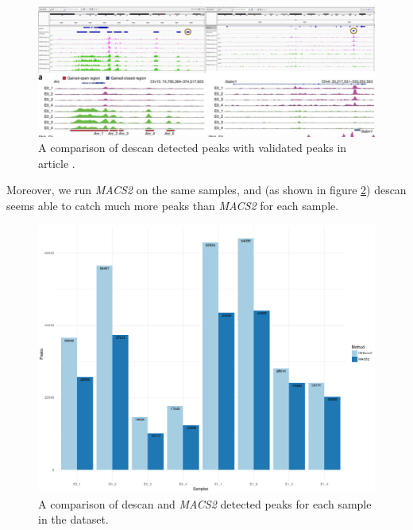 \begin{figure}[H]
\includegraphics[width=\textwidth,height=\textheight,keepaspectratio]{img/descan2/peaks.png}
\caption[\gls{descan} peaks detection]{A comparison of \gls{descan} detected peaks with validated peaks in article \cite{Su2017}.}
\label{fig:peaksdescan}
\centering
\end{figure}

Moreover, we run \textit{MACS2} on the same samples, and (as shown in figure \ref{fig:des2m2peaks}) \gls{descan} seems able to catch much more peaks than \textit{MACS2} for each sample.

\begin{figure}[H]
\includegraphics[width=\textwidth,height=\textheight,keepaspectratio]{img/descan2/d2m2_peaks_number.png}
\caption[The \gls{descan} and \textit{MACS2} peaks detection]{A comparison of \gls{descan} and \textit{MACS2} detected peaks for each sample in the dataset.}
\label{fig:des2m2peaks}
\centering
\end{figure}

